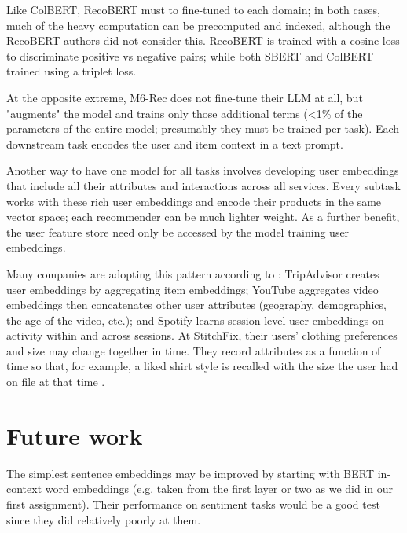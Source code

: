 \documentclass[11pt]{article}
\begin{document}
Like ColBERT, RecoBERT must to fine-tuned to each domain; in both cases, much of the heavy computation can be precomputed and indexed, although the RecoBERT authors did not consider this. RecoBERT is trained with a cosine loss to discriminate positive vs negative pairs; while both SBERT and ColBERT trained using a triplet loss. 

At the opposite extreme, M6-Rec does not fine-tune their LLM at all, but "augments" the model and trains only those additional terms (<1\% of the parameters of the entire model; presumably they must be trained per task). Each downstream task encodes the user and item context in a text prompt.

Another way to have one model for all tasks involves developing user embeddings that include all their attributes and interactions across all services. Every subtask works with these rich user embeddings and encode their products in the same vector space; each recommender can be much lighter weight. As a further benefit, the user feature store need only be accessed by the model training user embeddings. 

Many companies are adopting this pattern according to \cite{YanPatterns}: TripAdvisor creates user embeddings by aggregating item embeddings; YouTube aggregates video embeddings then concatenates other user attributes (geography, demographics, the age of the video, etc.); and Spotify learns session-level user embeddings on activity within and across sessions. At StitchFix, their users' clothing preferences and size may change together in time. They record attributes as a function of time so that, for example, a liked shirt style is recalled with the size the user had on file at that time \cite{StitchFixClientTime}.


\section{Future work} 

The simplest sentence embeddings may be improved by starting with BERT in-context word embeddings (e.g. taken from the first layer or two as we did in our first assignment). Their performance on sentiment tasks would be a good test since they did relatively poorly at them. 
\end{document}
